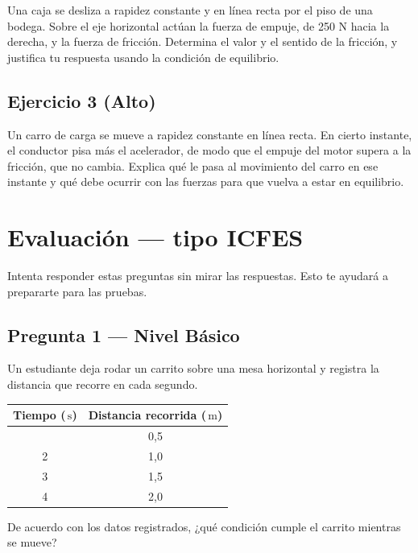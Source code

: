 \documentclass[
  spanish,
  letterpaper,
  12pt,
  oneside,
  open=any,
  DIV=15]{scrbook}
\newcounter{none} %
\newcommand{\setcolorsection}[2]{%
  \definecolor{currentsectionbg}{HTML}{#1}%
  \definecolor{currentsectionborder}{HTML}{#2}%
}
\begin{document}
Una caja se desliza a rapidez constante y en línea recta por el piso de
una bodega. Sobre el eje horizontal actúan la fuerza de empuje, de 250 N
hacia la derecha, y la fuerza de fricción. Determina el valor y el
sentido de la fricción, y justifica tu respuesta usando la condición de
equilibrio.

\subsection{Ejercicio 3 (Alto)}\label{ejercicio-3-alto-4}

Un carro de carga se mueve a rapidez constante en línea recta. En cierto
instante, el conductor pisa más el acelerador, de modo que el empuje del
motor supera a la fricción, que no cambia. Explica qué le pasa al
movimiento del carro en ese instante y qué debe ocurrir con las fuerzas
para que vuelva a estar en equilibrio.

\setcolorsection{f0c4b8}{dcb0a4}

\section{Evaluación --- tipo ICFES}\label{evaluaciuxf3n-tipo-icfes-5}

Intenta responder estas preguntas sin mirar las respuestas. Esto te
ayudará a prepararte para las pruebas.

\subsection{Pregunta 1 --- Nivel
Básico}\label{pregunta-1-nivel-buxe1sico-5}

Un estudiante deja rodar un carrito sobre una mesa horizontal y registra
la distancia que recorre en cada segundo.

{\def\LTcaptype{none} %
\begin{longtable}[]{@{}cc@{}}
\toprule\noalign{}
Tiempo (\(\,\text{s}\)) & Distancia recorrida (\(\,\text{m}\)) \\
\midrule\noalign{}
\endhead
\bottomrule\noalign{}
\endlastfoot
1 & 0,5 \\
2 & 1,0 \\
3 & 1,5 \\
4 & 2,0 \\
\end{longtable}
}

De acuerdo con los datos registrados, ¿qué condición cumple el carrito
mientras se mueve?
\end{document}
